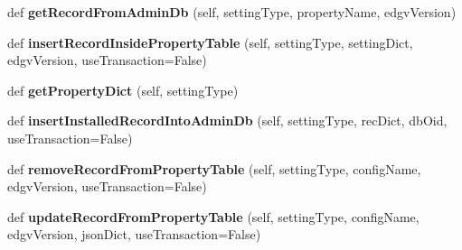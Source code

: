 \begin{DoxyCompactItemize}
\mbox{\label{class_dsg_tools_1_1_factories_1_1_db_factory_1_1postgis_db_1_1_postgis_db_a28a48a8099b88b524ed2728b1daf996b}} 
def {\bfseries get\+Record\+From\+Admin\+Db} (self, setting\+Type, property\+Name, edgv\+Version)
\item 
\mbox{\label{class_dsg_tools_1_1_factories_1_1_db_factory_1_1postgis_db_1_1_postgis_db_a2362c9ffd4401f5264fe22dc0bbe0f0c}} 
def {\bfseries insert\+Record\+Inside\+Property\+Table} (self, setting\+Type, setting\+Dict, edgv\+Version, use\+Transaction=False)
\item 
\mbox{\label{class_dsg_tools_1_1_factories_1_1_db_factory_1_1postgis_db_1_1_postgis_db_adebdb6e5888ad748ff81afa43a65c910}} 
def {\bfseries get\+Property\+Dict} (self, setting\+Type)
\item 
\mbox{\label{class_dsg_tools_1_1_factories_1_1_db_factory_1_1postgis_db_1_1_postgis_db_a64d1585b0ca498cce2c1eced63920737}} 
def {\bfseries insert\+Installed\+Record\+Into\+Admin\+Db} (self, setting\+Type, rec\+Dict, db\+Oid, use\+Transaction=False)
\item 
\mbox{\label{class_dsg_tools_1_1_factories_1_1_db_factory_1_1postgis_db_1_1_postgis_db_aca56256d86dc6bbedf2eb6e1848afb8c}} 
def {\bfseries remove\+Record\+From\+Property\+Table} (self, setting\+Type, config\+Name, edgv\+Version, use\+Transaction=False)
\item 
\mbox{\label{class_dsg_tools_1_1_factories_1_1_db_factory_1_1postgis_db_1_1_postgis_db_a7b2484807e418db6b589c6bbc12c4552}} 
def {\bfseries update\+Record\+From\+Property\+Table} (self, setting\+Type, config\+Name, edgv\+Version, json\+Dict, use\+Transaction=False)
\item 
\mbox{\label{class_dsg_tools_1_1_factories_1_1_db_factory_1_1postgis_db_1_1_postgis_db_adbba6879c24e74b26b8d3180c1726f37}} 

\end{DoxyCompactItemize}
